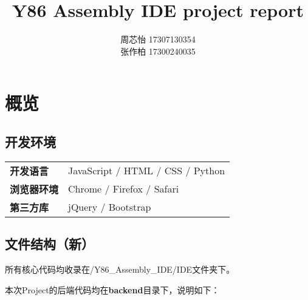 \documentclass[12pt]{article} %
\title{\textbf{Y86 Assembly IDE project report}}
\author{周芯怡 17307130354\\张作柏 17300240035}
\begin{document}
\begin{sloppypar}
\maketitle

\pagestyle{fancy}
\lhead{\textbf{{\thetitle}}}
\rhead{\textbf{\nouppercase{\firstleftmark}}}
\cfoot{\thepage}

\tableofcontents
\clearpage



\section{概览}

\subsection{开发环境}

\begin{table}[h]
\begin{tabular}{ll}
{\bf 开发语言}   & JavaScript / HTML / CSS / Python  \\
{\bf 浏览器环境} & Chrome / Firefox / Safari \\
{\bf 第三方库}   & jQuery / Bootstrap                             
\end{tabular}
\end{table}

\subsection{文件结构（新）}

所有核心代码均收录在/Y86\_Assembly\_IDE/IDE文件夹下。

\noindent
本次Project的后端代码均在{\bf backend}目录下，说明如下：


\end{sloppypar}
\end{document}
